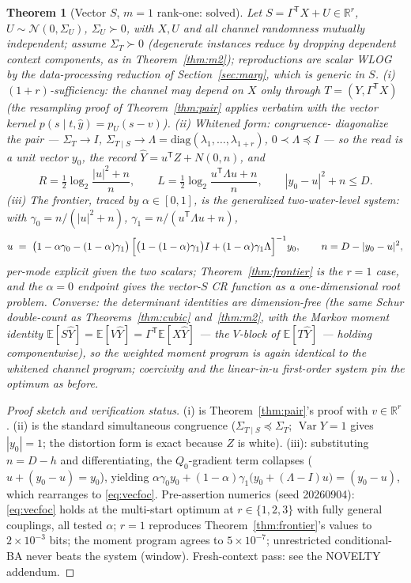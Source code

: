 \documentclass[11pt]{article}
\newtheorem{theorem}{Theorem}\newtheorem{corollary}{Corollary}
\newcommand{\E}{\mathbb{E}}\newcommand{\tr}{\operatorname{tr}}
\newcommand{\hY}{\widehat Y}
\begin{document}
\begin{theorem}[Vector $S$, $m=1$ rank-one: solved]\label{thm:vecS}
Let $S=\Gamma^{\mathsf T}X+U\in\mathbb R^r$, $U\sim\mathcal N(0,\Sigma_U)$,
$\Sigma_U\succ0$, with $X,U$ and all channel randomness mutually
independent; assume $\Sigma_T\succ0$ (degenerate instances reduce by
dropping dependent context components, as in Theorem~\ref{thm:m2});
reproductions are scalar WLOG by the data-processing reduction of
Section~\ref{sec:marg}, which is generic in $S$.
(i) \emph{$(1{+}r)$-sufficiency:} the channel may depend on
$X$ only through $T=(Y,\Gamma^{\mathsf T}X)$ (the resampling proof of
Theorem~\ref{thm:pair} applies verbatim with the vector kernel
$p(s\mid t,\hat y)=p_U(s-v)$). (ii) \emph{Whitened form:} congruence-
diagonalize the pair --- $\Sigma_T\to I$, $\Sigma_{T\mid S}\to
\Lambda=\mathrm{diag}(\lambda_1,\dots,\lambda_{1+r})$,
$0\prec\Lambda\preceq I$ --- so the read is a unit vector $y_0$, the
record $\hY=u^{\mathsf T}Z+N(0,n)$, and
\[
R=\tfrac12\log_2\frac{|u|^2+n}{n},\qquad
L=\tfrac12\log_2\frac{u^{\mathsf T}\Lambda u+n}{n},\qquad
|y_0-u|^2+n\le D .
\]
(iii) \emph{The frontier}, traced by $\alpha\in[0,1]$, is the generalized
two-water-level system: with $\gamma_0=n/(|u|^2{+}n)$,
$\gamma_1=n/(u^{\mathsf T}\Lambda u{+}n)$,
\begin{equation}
u\;=\;\bigl(1-\alpha\gamma_0-(1-\alpha)\gamma_1\bigr)\,
\Bigl[\bigl(1-(1-\alpha)\gamma_1\bigr)I+(1-\alpha)\gamma_1\Lambda
\Bigr]^{-1}y_0,
\qquad n=D-|y_0-u|^2,
\label{eq:vecfoc}
\end{equation}
per-mode explicit given the two scalars; Theorem~\ref{thm:frontier} is the
$r=1$ case, and the $\alpha=0$ endpoint gives the vector-$S$ CR function
as a one-dimensional root problem. \emph{Converse:} the determinant
identities are dimension-free (the same Schur double-count as
Theorems~\ref{thm:cubic} and~\ref{thm:m2}, with the Markov moment identity
$\E[S\hY]=\E[V\hY]=\Gamma^{\mathsf T}\E[X\hY]$ --- the $V$-block of
$\E[T\hY]$ --- holding componentwise), so the weighted
moment program is again identical to the whitened channel program;
coercivity and the linear-in-$u$ first-order system pin the optimum as
before.
\end{theorem}
\begin{proof}[Proof sketch and verification status]
(i) is Theorem~\ref{thm:pair}'s proof with $v\in\mathbb R^r$. (ii) is the
standard simultaneous congruence ($\Sigma_{T\mid S}\preceq\Sigma_T$;
$\operatorname{Var}Y=1$ gives $|y_0|=1$; the distortion form is exact
because $Z$ is white). (iii): substituting $n=D-h$ and differentiating,
the $Q_0$-gradient term collapses ($u+(y_0-u)=y_0$), yielding
$\alpha\gamma_0y_0+(1-\alpha)\gamma_1\bigl(y_0+(\Lambda-I)u\bigr)
=(y_0-u)$, which rearranges to \eqref{eq:vecfoc}. Pre-assertion numerics
(seed 20260904): \eqref{eq:vecfoc} holds at the multi-start optimum at
$r\in\{1,2,3\}$ with fully general couplings, all tested $\alpha$;
$r{=}1$ reproduces Theorem~\ref{thm:frontier}'s values to $2\times10^{-3}$
bits; the moment program agrees to $5\times10^{-7}$; unrestricted
conditional-BA never beats the system (window). Fresh-context pass: see
the NOVELTY addendum.
\end{proof}
\end{document}
